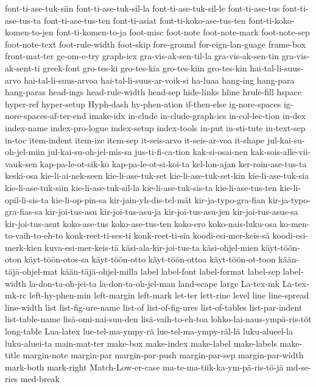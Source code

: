{font-ti-ase-tuk-siin
font-ti-ase-tuk-sil-la
font-ti-ase-tuk-sil-le
font-ti-ase-tus
font-ti-ase-tus-ta
font-ti-ase-tus-ten
font-ti-asiat
font-ti-koko-ase-tus-ten
font-ti-koko-komen-to-jen
font-ti-komen-to-ja
foot-misc
foot-note
foot-note-mark
foot-note-sep
foot-note-text
foot-rule-width
foot-skip
fore-ground
for-eign-lan-guage
frame-box
front-mat-ter
ge-om-e-try
graph-icx
gra-vis-ak-sen-til-la
gra-vis-ak-sen-tin
gra-vis-ak-sent-ti
greek-font
gro-tes-ki
gro-tes-kia
gro-tes-kiin
gro-tes-kin
hai-tal-li-suus-arvo
hai-tal-li-suus-arvoa
hai-tal-li-suus-ar-voik-si
ha-luaa
hang-ing
hang-para
hang-paras
head-ings
head-rule-width
head-sep
hide-links
hline
hrule-fill
hspace
hyper-ref
hyper-setup
Hyph-dash
hy-phen-ation
if-then-else
ig-nore-spaces
ig-nore-spaces-af-ter-end
imake-idx
in-clude
in-clude-graph-ics
in-col-lec-tion
in-dex
index-name
index-pro-logue
index-setup
index-tools
in-put
in-sti-tute
in-text-sep
in-toc
item-indent
item-ize
item-sep
it-seis-arvo
it-seis-ar-voa
it-shape
jul-kai-su-oh-jel-miin
jul-kai-su-oh-jel-mis-sa
jus-ti-fi-ca-tion
kak-si-osai-nen
kak-sois-alle-vii-vauk-sen
kap-pa-le-ot-sik-ko
kap-pa-le-ot-si-koi-ta
kel-lon-ajan
ker-roin-ase-tus-ta
keski-osa
kie-li-ai-nek-seen
kie-li-ase-tuk-set
kie-li-ase-tuk-set-kin
kie-li-ase-tuk-sia
kie-li-ase-tuk-siin
kie-li-ase-tuk-sil-la
kie-li-ase-tuk-sis-ta
kie-li-ase-tus-ten
kie-li-opil-li-sis-ta
kie-li-op-pin-sa
kir-jain-yh-dis-tel-mät
kir-ja-typo-gra-fian
kir-ja-typo-gra-fias-sa
kir-joi-tus-asu
kir-joi-tus-asu-ja
kir-joi-tus-asu-jen
kir-joi-tus-asus-sa
kir-joi-tus-asut
koko-ase-tus
koko-ase-tus-ten
koko-ero
koko-nais-luku-osa
ko-men-to-vaih-to-eh-to
konk-reet-ti-ses-ti
konk-reet-ti-sia
koodi-esi-mer-keis-sä
koodi-esi-merk-kien
kuva-esi-mer-keis-tä
käsi-ala-kir-joi-tus-ta
käsi-ohjel-mien
käyt-töön-oton
käyt-töön-otos-sa
käyt-töön-otto
käyt-töön-ottoa
käyt-töön-ot-toon
kään-täjä-ohjel-mat
kään-täjä-ohjel-milla
label
label-font
label-format
label-sep
label-width
la-don-ta-oh-jei-ta
la-don-ta-oh-jel-man
land-scape
large
La-tex-mk
La-tex-mk-rc
left-hy-phen-min
left-margin
left-mark
let-ter
lett-rine
level
line
line-spread
line-width
list
list-fig-ure-name
list-of
list-of-fig-ures
list-of-tables
list-par-indent
list-table-name
lisä-omi-nai-suu-den
lisä-vaih-to-eh-toa
lohko-lai-naus-ympä-ris-töt
long-table
Lua-latex
lue-tel-ma-ympy-rä
lue-tel-ma-ympy-räl-lä
luku-alueel-la
luku-aluei-ta
main-mat-ter
make-box
make-index
make-label
make-labels
make-title
margin-note
margin-par
margin-par-push
margin-par-sep
margin-par-width
mark-both
mark-right
Match-Low-er-case
ma-te-ma-tiik-ka-ym-pä-ris-tö-jä
md-se-ries
med-break
}
